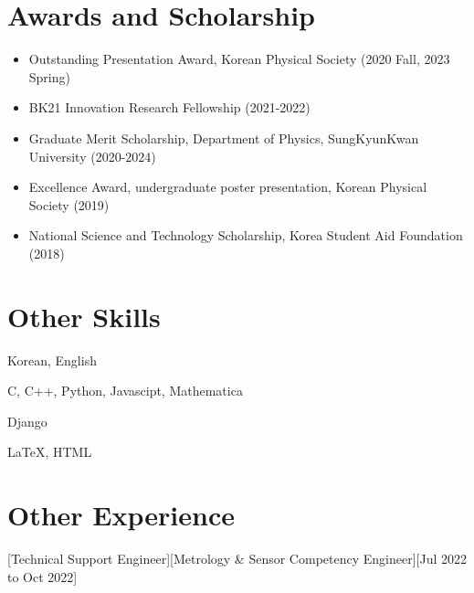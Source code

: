 \documentclass{article}
\begin{document}

\section{Awards and Scholarship}
\begin{itemize}
    \item Outstanding Presentation Award, Korean Physical Society (2020 Fall, 2023 Spring)
	\item BK21 Innovation Research Fellowship (2021-2022)
	\item Graduate Merit Scholarship, Department of Physics, SungKyunKwan University (2020-2024)
	\item Excellence Award, undergraduate poster presentation, Korean Physical Society (2019)
	\item National Science and Technology Scholarship, Korea Student Aid Foundation (2018)
\end{itemize}

\section{Other Skills}
\begin{description}[widest=Markup]
\item[Languages] Korean, English
\item[Programming Languages] C, C++, Python, Javascipt, Mathematica
\item[Framework] Django
\item[Markup] LaTeX, HTML
\end{description}
\section{Other Experience}
[Technical Support Engineer][Metrology \& Sensor Competency Engineer][Jul 2022 to Oct 2022]
\end{document}
